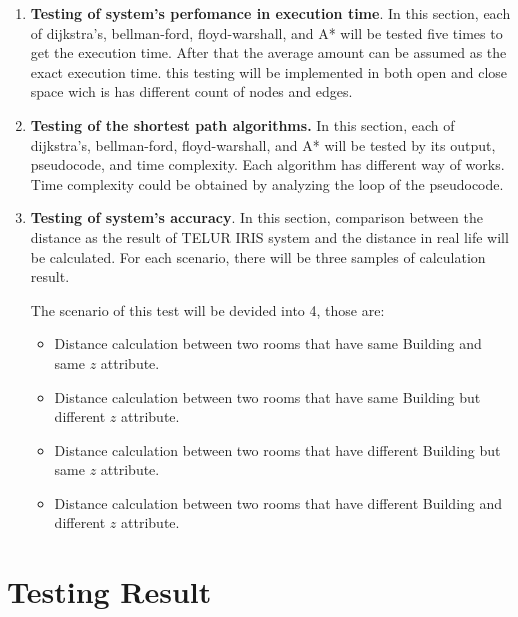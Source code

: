 \begin{enumerate}
	\item \textbf{Testing of system's perfomance in execution time}. In this section, each of dijkstra's, bellman-ford, floyd-warshall, and A* will be tested five times to get the execution time. After that the average amount can be assumed as the exact execution time. this testing will be implemented in both open and close space wich is has different count of nodes and edges.
	
	\item \textbf{Testing of the shortest path algorithms.} In this section, each of dijkstra's, bellman-ford, floyd-warshall, and A* will be tested by its output, pseudocode, and time complexity. Each algorithm has different way of works. Time complexity could be obtained by analyzing the loop of the pseudocode.
	
	\item \textbf{Testing of system's accuracy}. In this section, comparison between the distance as the result of TELUR IRIS system and  the distance in real life will be calculated. For each scenario, there will be three samples of calculation result.
	
	The scenario of this test will be devided into 4, those are:
	\begin{itemize}
		\item Distance calculation between two rooms that have same Building and same $z$ attribute.
		\item Distance calculation between two rooms that have same Building but different $z$ attribute.
		\item Distance calculation between two rooms that have different Building but same $z$ attribute.
		\item Distance calculation between two rooms that have different Building and different $z$ attribute.
	\end{itemize}
	
\end{enumerate}

\section{Testing Result}

